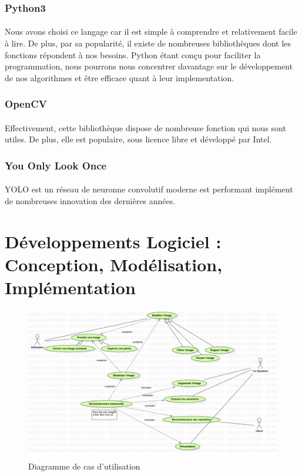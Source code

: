 \documentclass[a4paper]{article}
\begin{document}
			\subsubsection*{Python3}
				\paragraph{} Nous avons choisi ce langage car il est simple à comprendre et relativement facile à lire. De plus, par sa popularité, il existe de nombreuses bibliothèques dont les fonctions répondent à nos besoins. Python étant conçu pour faciliter la programmation, nous pourrons nous concentrer davantage sur le développement de nos algorithmes et être efficace quant à leur implementation.
			\subsubsection*{OpenCV}
				\paragraph{} Effectivement, cette bibliothèque dispose de nombreuse fonction qui nous sont utiles. De plus, elle est populaire, sous licence libre et développé par Intel.
			\subsubsection*{You Only Look Once}
				\paragraph{} YOLO est un réseau de neuronne convolutif moderne est performant implément de nombreuses innovation des dernières années.

	\newpage
	\section{Développements Logiciel : Conception, Modélisation, Implémentation}
		\begin{figure}[h]
			\centering
			\includegraphics[width=\textwidth]{UseCaseDiagram.png}
			\caption{Diagramme de cas d'utilisation}
			\label{fig:useCaseDiagram}
		\end{figure}
\end{document}
